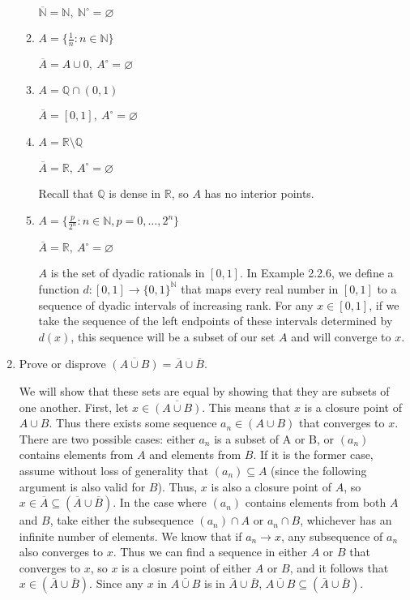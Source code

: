 \documentclass[11pt]{article}
\newcommand{\N}{\mathbb{N}}
\newcommand{\Q}{\mathbb{Q}}
\newcommand{\R}{\mathbb{R}}
\begin{document}
\begin{enumerate}
\begin{enumerate}
$\overline{\N}=\N,\ \N^\circ=\varnothing$
\item{$A=\{\frac{1}{n}:n\in\N\}$}

$\overline{A}=A\cup0,\ A^\circ=\varnothing$
\item{$A=\Q\cap(0,1)$}

$\overline{A}=[0,1],\ A^\circ=\varnothing$
\item{$A=\R\setminus\Q$}

$\overline{A}=\R,\ A^\circ=\varnothing$ 

Recall that $\Q$ is dense in $\R$, so $A$ has no interior points.
\item{$A=\{\frac{p}{2^n}:n\in\N,p=0,\ldots,2^n\}$}

$\overline{A}=\R,\ A^\circ=\varnothing$

$A$ is the set of dyadic rationals in $[0,1]$. In Example 2.2.6, we define
a function $d:[0,1]\to\{0,1\}^\N$ that maps every real number in $[0,1]$
to a sequence of dyadic intervals of increasing rank. For any 
$x\in [0,1]$, if we take the sequence
of the left endpoints of these intervals determined by $d(x)$,
this sequence will be a subset
of our set $A$ and will converge to $x$.
\end{enumerate}
\item{Prove or disprove $\overline{(A\cup B)}=\overline{A}\cup\overline{B}$.}

We will show that these sets are equal by showing that they are subsets
of one another. First, let $x\in\overline{(A\cup B)}$. This means that
$x$ is a closure point of $A\cup B$. Thus there exists some sequence 
$a_n\in(A\cup B)$ that converges to $x$. There are two possible cases:
either $a_n$ is a subset of A or B, or $(a_n)$ contains elements from $A$
and elements from $B$. If it is the former case, assume without loss of
generality that $(a_n)\subseteq A$ (since the following argument is also
valid for $B$). Thus, $x$ is also a closure point of $A$, so
$x\in\overline{A}\subseteq(\overline{A}\cup\overline{B})$. In the case
where $(a_n)$ contains elements from both $A$ and $B$, take either the
subsequence $(a_n)\cap A$ or $a_n\cap B$, whichever has an infinite
number of elements. We know that if $a_n\to x$, any subsequence of $a_n$
also converges to $x$. Thus we can find a sequence in either $A$ or $B$
that converges to $x$, so $x$ is a closure point of either $A$ or $B$, and it
follows that $x\in(\overline{A}\cup\overline{B})$. 
Since any $x$ in
$\overline{A\cup B}$ is in $\overline{A}\cup\overline{B}$,
$\overline{A\cup B}\subseteq(\overline{A}\cup\overline{B})$.


\end{enumerate}
\end{document}
